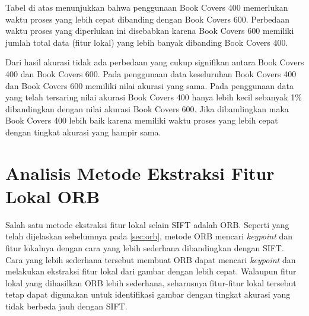 Tabel di atas menunjukkan bahwa penggunaan Book Covers 400 memerlukan waktu proses yang lebih cepat dibanding dengan Book Covers 600. Perbedaan waktu proses yang diperlukan ini disebabkan karena Book Covers 600 memiliki jumlah total data (fitur lokal) yang lebih banyak dibanding Book Covers 400.  

Dari hasil akurasi tidak ada perbedaan yang cukup signifikan antara Book Covers 400 dan Book Covers 600. Pada penggunaan data keseluruhan Book Covers 400 dan Book Covers 600 memiliki nilai akurasi yang sama. Pada penggunaan data yang telah tersaring nilai akurasi Book Covers 400 hanya lebih kecil sebanyak 1\% dibandingkan dengan nilai akurasi Book Covers 600. Jika dibandingkan maka Book Covers 400 lebih baik karena memiliki waktu proses yang lebih cepat dengan tingkat akurasi yang hampir sama.

%

\section{Analisis Metode Ekstraksi Fitur Lokal ORB}
\label{sec:analisis_orb}
Salah satu metode ekstraksi fitur lokal selain SIFT adalah ORB. Seperti yang telah dijelaskan sebelumnya pada \ref{sec:orb}, metode ORB mencari \textit{keypoint} dan fitur lokalnya dengan cara yang lebih sederhana dibandingkan dengan SIFT. Cara yang lebih sederhana tersebut membuat ORB dapat mencari \textit{keypoint} dan melakukan ekstraksi fitur lokal dari gambar dengan lebih cepat. Walaupun fitur lokal yang dihasilkan ORB lebih sederhana, seharusnya fitur-fitur lokal tersebut tetap dapat digunakan untuk identifikasi gambar dengan tingkat akurasi yang tidak berbeda jauh dengan SIFT.

